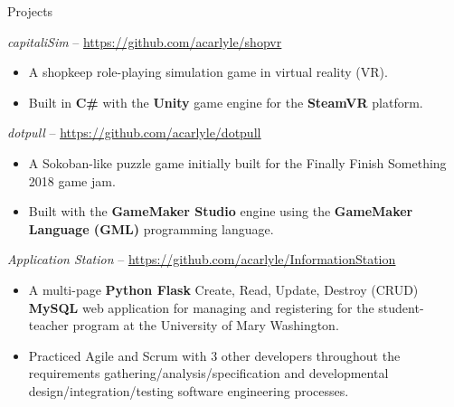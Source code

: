 \documentclass[calibri]{mcdowellcv}
\begin{document}
	\begin{cvsection}{Projects}
		\begin{cvsubsection}{\textit{capitaliSim} -- {\href{https://github.com/acarlyle/shopvr}{\underline{\textcolor{ColorDarkBlue}{https://github.com/acarlyle/shopvr}}}}}{}
			\begin{itemize}
				\item A shopkeep role-playing simulation game in virtual reality (VR).
				\item Built in \textbf{C\#} with the \textbf{Unity} game engine for the \textbf{SteamVR} platform.  
			\end{itemize}
		\end{cvsubsection}
		
		\begin{cvsubsection}{\textit{dotpull} -- {\href{https://github.com/acarlyle/dotpull}{\underline{\textcolor{ColorDarkBlue}{https://github.com/acarlyle/dotpull}}}}}{}	
			\begin{itemize}
				\item A Sokoban-like puzzle game initially built for the Finally Finish Something 2018 game jam.  
				\item Built with the \textbf{GameMaker Studio} engine using the \textbf{GameMaker Language (GML)} programming language.  
			\end{itemize}
		\end{cvsubsection}
		
		\begin{cvsubsection}{\textit{Application Station} -- {\href{https://github.com/acarlyle/InformationStation}{\underline{\textcolor{ColorDarkBlue}{https://github.com/acarlyle/InformationStation}}}}}{}		
			\begin{itemize}
				\item A multi-page \textbf{Python Flask} Create, Read, Update, Destroy (CRUD) \textbf{MySQL} web application for managing and registering for the student-teacher program at the University of Mary Washington.   
				\item Practiced Agile and Scrum with 3 other developers throughout the requirements gathering/analysis/specification and developmental design/integration/testing software engineering processes. 
			\end{itemize}
		\end{cvsubsection}
	\end{cvsection}
\end{document}
